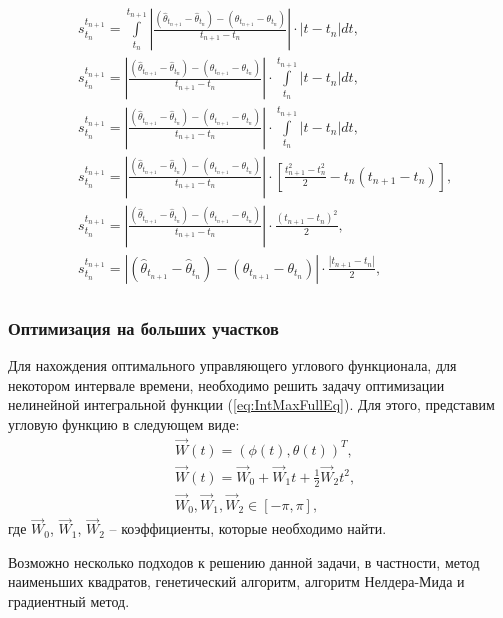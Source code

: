 \begin{equation}
  \begin{aligned}
    & s^{t_{n+1}}_{t_n} = \int\limits_{t_n}^{t_{n+1}} \left|\frac{(\hat{\theta}_{t_{n+1}} - \hat{\theta}_{t_{n}}) - (\theta_{t_{n+1}} - \theta_{t_{n}})}{t_{n+1} - t_{n}}\right| \cdot |t - t_{n}| dt, \\
    & s^{t_{n+1}}_{t_n} = \left|\frac{(\hat{\theta}_{t_{n+1}} - \hat{\theta}_{t_{n}}) - (\theta_{t_{n+1}} - \theta_{t_{n}})}{t_{n+1} - t_{n}}\right| \cdot \int\limits_{t_n}^{t_{n+1}} |t - t_{n}| dt, \\
    & s^{t_{n+1}}_{t_n} = \left|\frac{(\hat{\theta}_{t_{n+1}} - \hat{\theta}_{t_{n}}) - (\theta_{t_{n+1}} - \theta_{t_{n}})}{t_{n+1} - t_{n}}\right| \cdot \int\limits_{t_n}^{t_{n+1}} |t - t_{n}| dt, \\
    & s^{t_{n+1}}_{t_n} = \left|\frac{(\hat{\theta}_{t_{n+1}} - \hat{\theta}_{t_{n}}) - (\theta_{t_{n+1}} - \theta_{t_{n}})}{t_{n+1} - t_{n}}\right| \cdot \left[ \frac{t^2_{n+1} - t^2_{n}}{2} - t_{n}(t_{n+1} - t_{n}) \right], \\
    & s^{t_{n+1}}_{t_n} = \left|\frac{(\hat{\theta}_{t_{n+1}} - \hat{\theta}_{t_{n}}) - (\theta_{t_{n+1}} - \theta_{t_{n}})}{t_{n+1} - t_{n}}\right| \cdot \frac{(t_{n+1} - t_{n})^2}{2}, \\
    & s^{t_{n+1}}_{t_n} = \left|(\hat{\theta}_{t_{n+1}} - \hat{\theta}_{t_{n}}) - (\theta_{t_{n+1}} - \theta_{t_{n}})\right| \cdot \frac{|t_{n+1} - t_{n}|}{2}, \\
  \end{aligned}
\end{equation}
\subsubsection{Оптимизация на больших участков}
\noindent\indent Для нахождения оптимального управляющего углового функционала,
для некотором интервале времени, необходимо решить задачу оптимизации нелинейной
интегральной функции (\ref{eq:IntMaxFullEq}). Для этого, представим угловую функцию
в следующем виде:
\begin{equation}
  \begin{aligned}
    & \vec{W}(t) = (\phi(t), \theta(t))^T, \\
    & \vec{W}(t) = \vec{W}_0 + \vec{W}_1 t + \frac{1}{2}\vec{W}_2 t^2, \\
    & \vec{W}_0, \vec{W}_1, \vec{W}_2 \in [-\pi, \pi],
  \end{aligned}
\end{equation}
где $\vec{W}_0$, $\vec{W}_1$, $\vec{W}_2$ -- коэффициенты, которые необходимо найти.\par
  Возможно несколько подходов к решению данной задачи, в частности, метод наименьших
квадратов, генетический алгоритм, алгоритм Нелдера-Мида и градиентный метод.
